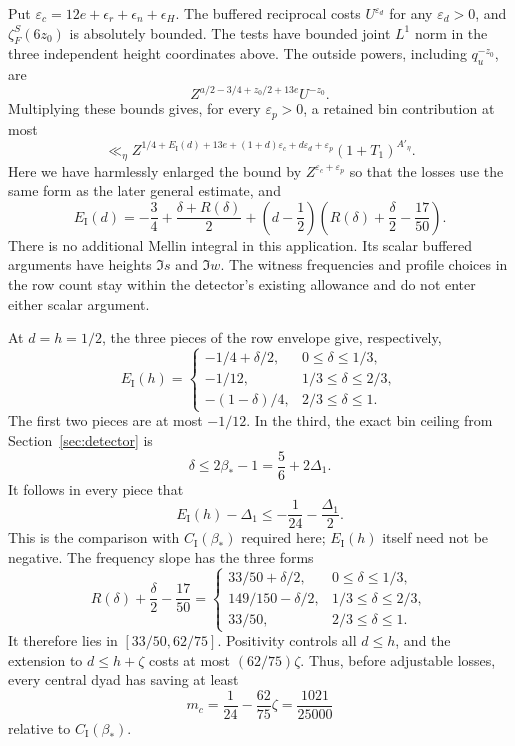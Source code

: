 \documentclass[11pt,a4paper]{article}
\numberwithin{equation}{section}
\numberwithin{figure}{section}
\theoremstyle{definition}
\theoremstyle{remark}
\begin{document}
Put $\varepsilon_c=12e+\epsilon_r+\epsilon_n+\epsilon_H$.
The buffered reciprocal costs $U^{\varepsilon_d}$ for any
$\varepsilon_d>0$, and $\zeta_F^S(6z_0)$ is absolutely bounded.
The tests have bounded joint $L^1$ norm in the three independent height
coordinates above.  The outside powers, including $q_u^{-z_0}$, are
\[
 Z^{a/2-3/4+z_0/2+13e}U^{-z_0}.
\]
Multiplying these bounds gives, for every $\varepsilon_p>0$, a retained
bin contribution at most
\begin{equation}
 \ll_\eta Z^{1/4+E_{\mathrm I}(d)+13e
       +(1+d)\varepsilon_c+d\varepsilon_d+\varepsilon_p}
 (1+T_1)^{A'_\eta}.
 \label{eq:balanced-central-contribution}
\end{equation}
Here we have harmlessly enlarged the bound by
$Z^{\varepsilon_c+\varepsilon_p}$ so that the losses use the same form as
the later general estimate, and
\[
 E_{\mathrm I}(d)=-\frac34+\frac{\delta+R(\delta)}2
 +\left(d-\frac12\right)
       \left(R(\delta)+\frac\delta2-\frac{17}{50}\right).
\]
There is no additional Mellin integral in this application.  Its scalar
buffered arguments have heights $\Im s$ and $\Im w$.  The witness
frequencies and profile choices in the row count stay within the detector's
existing allowance and do not enter either scalar argument.

At $d=h=1/2$, the three pieces of the row envelope give, respectively,
\[
 E_{\mathrm I}(h)=
 \begin{cases}
  -1/4+\delta/2,&0\le\delta\le1/3,\\
  -1/12,&1/3\le\delta\le2/3,\\
  -(1-\delta)/4,&2/3\le\delta\le1.
 \end{cases}
\]
The first two pieces are at most $-1/12$.  In the third, the exact bin
ceiling from Section~\ref{sec:detector} is
\[
 \delta\le2\beta_*-1=\frac56+2\Delta_1.
\]
It follows in every piece that
\[
 E_{\mathrm I}(h)-\Delta_1
 \le-\frac1{24}-\frac{\Delta_1}{2}.
\]
This is the comparison with $C_{\mathrm I}(\beta_*)$ required here;
$E_{\mathrm I}(h)$ itself need not be negative.
The frequency slope has the three forms
\[
 R(\delta)+\frac\delta2-\frac{17}{50}
 =\begin{cases}
  33/50+\delta/2,&0\le\delta\le1/3,\\
  149/150-\delta/2,&1/3\le\delta\le2/3,\\
  33/50,&2/3\le\delta\le1.
 \end{cases}
\]
It therefore lies in $[33/50,62/75]$.  Positivity controls all $d\le h$,
and the extension to $d\le h+\zeta$ costs at most $(62/75)\zeta$.
Thus, before adjustable losses, every central dyad has saving at least
\[
 m_c=\frac1{24}-\frac{62}{75}\zeta=\frac{1021}{25000}
\]
relative to $C_{\mathrm I}(\beta_*)$.
\end{document}
